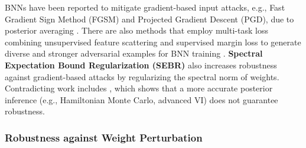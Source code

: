 


BNNs have been reported to mitigate gradient-based input attacks, e.g., Fast Gradient Sign Method (FGSM) and Projected Gradient Descent (PGD), due to posterior averaging \cite{carbone2020a}. There are also methods that employ multi-task loss combining unsupervised feature scattering and supervised margin loss to generate diverse and stronger adversarial examples for BNN training \cite{CHEN2022156}. \textbf{Spectral Expectation Bound Regularization (SEBR)} \cite{sebr2021} also increases robustness against gradient-based attacks by regularizing the spectral norm of weights. Contradicting work includes \cite{Blaas2021}, which shows that a more accurate posterior inference (e.g., Hamiltonian Monte Carlo, advanced VI) does not guarantee robustness.




\subsubsection{Robustness against Weight Perturbation}


